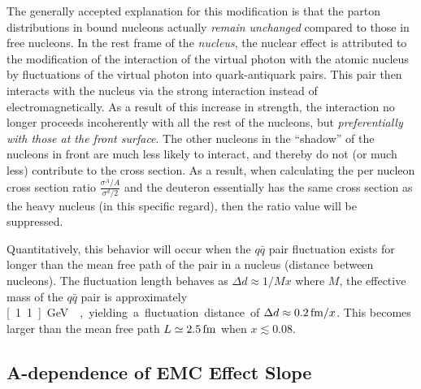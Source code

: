 The generally accepted explanation for this modification is that the parton distributions in bound nucleons actually \emph{remain unchanged} compared to those in free nucleons. In the rest frame of the \emph{nucleus}, the nuclear effect is attributed to the modification of the interaction of the virtual photon with the atomic nucleus by fluctuations of the virtual photon into quark-antiquark pairs. This pair then interacts with the nucleus via the strong interaction instead of electromagnetically. As a result of this increase in strength, the interaction no longer proceeds incoherently with all the rest of the nucleons, but \emph{preferentially with those at the front surface}. The other nucleons in the ``shadow'' of the nucleons in front are much less likely to interact, and thereby do not (or much less) contribute to the cross section. As a result, when calculating the per nucleon cross section ratio $\frac{\sigma^A/A}{\sigma^d/2}$ and the deuteron essentially has the same cross section as the heavy nucleus (in this specific regard), then the ratio value will be suppressed.  

Quantitatively, this behavior will occur when the $q\bar{q}$ pair fluctuation exists for longer than the mean free path of the pair in a nucleus (distance between nucleons). The fluctuation length behaves as $\Delta d \approx 1/Mx$ where $M$, the effective mass of the $q\bar{q}$ pair is approximately \unit[1.1]{GeV}~\cite{Kopeliovich:2012kw}, yielding a fluctuation distance of $\Delta d \approx \unit[0.2]{fm}/x$. This becomes larger than the mean free path $L\simeq\unit[2.5]{fm}$ when $x\lesssim 0.08$.

\subsection{A-dependence of EMC Effect Slope}


